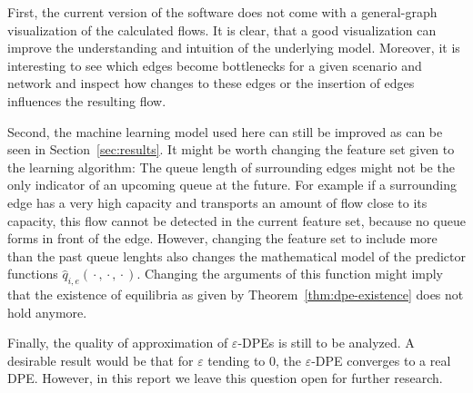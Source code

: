 \documentclass[titlepage]{scrartcl}
\theoremstyle{definition}
\newcommand{\emptyArg}{\,\boldsymbol{\cdot}\,}
\newcommand{\predq}{\hat q}
\begin{document}
    First, the current version of the software does not come with a general-graph visualization of the calculated flows.
    It is clear, that a good visualization can improve the understanding and intuition of the underlying model.
    Moreover, it is interesting to see which edges become bottlenecks for a given scenario and network and inspect how changes to these edges or the insertion of edges influences the resulting flow.

    Second, the machine learning model used here can still be improved as can be seen in Section~\ref{sec:results}.
    It might be worth changing the feature set given to the learning algorithm:
    The queue length of surrounding edges might not be the only indicator of an upcoming queue at the future.
    For example if a surrounding edge has a very high capacity and transports an amount of flow close to its capacity, this flow cannot be detected in the current feature set, because no queue forms in front of the edge. 
    However, changing the feature set to include more than the past queue lenghts also changes the mathematical model of the predictor functions $\predq_{i,e}(\emptyArg, \emptyArg, \emptyArg)$.
    Changing the arguments of this function might imply that the existence of equilibria as given by Theorem~\ref{thm:dpe-existence} does not hold anymore.
    
    Finally, the quality of approximation of $\varepsilon$-DPEs is still to be analyzed.
    A desirable result would be that for $\varepsilon$ tending to $0$, the $\varepsilon$-DPE converges to a real DPE.
    However, in this report we leave this question open for further research.

    \clearpage
    \printbibliography
\end{document}
